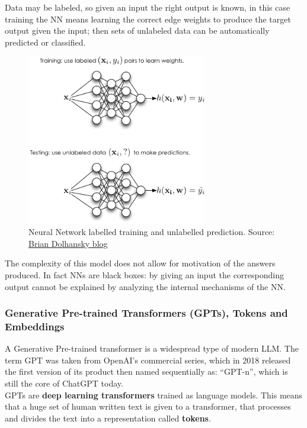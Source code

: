 \documentclass[12pt]{article}
\begin{document}
Data may be labeled, so given an input the right output is known, in this case training the NN means learning the correct edge weights to produce the target output given the input; then sets of unlabeled data can be automatically predicted or classified.
    \begin{figure}[H]
    \centering
            \includegraphics[width=0.7\textwidth]{trainingNN.png}
    \caption[Neural Network labelled training and unlabelled prediction]{Neural Network labelled training and unlabelled prediction. Source: \href{https://www.briandolhansky.com/blog/artificial-neural-networks-linear-regression-part-1}{Brian Dolhansky blog}}
    \end{figure}

The complexity of this model does not allow for motivation of the answers produced. In fact NNs are black boxes: by giving an input the corresponding output cannot be explained by analyzing the internal mechanisms of the NN.

        \subsubsection{Generative Pre-trained Transformers (GPTs), Tokens and Embeddings}
A Generative Pre-trained transformer is a widespread type of modern LLM. The term GPT was taken from OpenAI's commercial series, which in 2018 released the first version of its product then named sequentially as: ``GPT-n'', which is still the core of ChatGPT today.\\
GPTs are \textbf{deep learning transformers} trained as language models. This means that a huge set of human written text is given to a transformer, that processes and divides the text into a representation called \textbf{tokens}.\\
\end{document}
